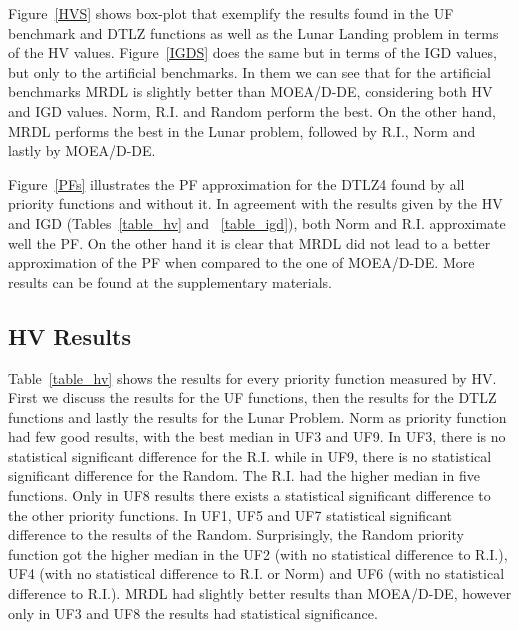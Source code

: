 
Figure~\ref{HVS} shows box-plot that exemplify the results found in the UF benchmark and DTLZ functions as well as the Lunar Landing problem in terms of the HV values. Figure~\ref{IGDS} does the same but in terms of the IGD values, but only to the artificial benchmarks. In them we can see that for the artificial benchmarks MRDL is slightly better than MOEA/D-DE, considering both HV and IGD values. Norm, R.I. and Random perform the best. On the other hand, MRDL performs the best in the Lunar problem, followed by R.I., Norm and lastly by MOEA/D-DE.


Figure~\ref{PFs} illustrates the PF approximation for the DTLZ4 found by all priority functions and without it. In agreement with the results given by the HV and IGD (Tables~\ref{table_hv} and ~\ref{table_igd}), both Norm and R.I. approximate well the PF. On the other hand it is clear that MRDL did not lead to a better approximation of the PF when compared to the one of MOEA/D-DE. More results can be found at the supplementary materials.

\subsection{HV Results}

Table~\ref{table_hv} shows the results for every priority function measured by HV. First we discuss the results for the UF functions, then the results for the DTLZ functions and lastly the results for the Lunar Problem. Norm as priority function had few good results, with  the best median in UF3 and UF9. In UF3, there is no statistical significant difference for the R.I. while in UF9, there is no statistical significant difference for the Random. The R.I. had the higher median in five functions. Only in UF8 results there exists a statistical significant difference to the other priority functions.  In UF1, UF5 and UF7 statistical significant difference to the results of the Random. Surprisingly, the Random priority function got the higher median in the UF2 (with no statistical difference to R.I.), UF4 (with no statistical difference to R.I. or Norm) and UF6 (with no statistical difference to R.I.). MRDL had slightly better results than MOEA/D-DE, however only in UF3 and UF8 the results had statistical significance.


